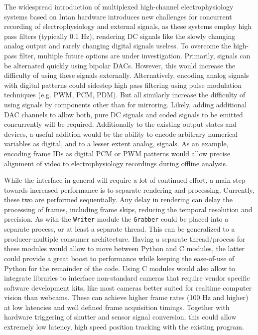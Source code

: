 The widespread introduction of multiplexed high-channel electrophysiology systems based on Intan hardware introduces new challenges for concurrent recording of electrophysiology and external signals, as these systems employ high pass filters (typically 0.1 Hz), rendering DC signals like the slowly changing analog output and rarely changing digital signals useless. To overcome the high-pass filter, multiple future options are under investigation. Primarily, signals can be alternated quickly using bipolar DACs. However, this would increase the difficulty of using these signals externally. Alternatively, encoding analog signals with digital patterns could sidestep high pass filtering using pulse modulation techniques (e.g. PWM, PCM, PDM). But all similarly increase the difficulty of using signals by components other than for mirroring. Likely, adding additional DAC channels to allow both, pure DC signals and coded signals to be emitted concurrently will be required. Additionally to the existing output states and devices, a useful addition would be the ability to encode arbitrary numerical variables as digital, and to a lesser extent analog, signals. As an example, encoding frame IDs as digital PCM or PWM patterns would allow precise alignment of video to electrophysiology recordings during offline analysis.

While the interface in general will require a lot of continued effort, a main step towards increased performance is to separate rendering and processing. Currently, these two are performed sequentially. Any delay in rendering can delay the processing of frames, including frame skips, reducing the temporal resolution and precision. As with the \texttt{Writer} module the \texttt{Grabber} could be placed into a separate process, or at least a separate thread. This can be generalized to a producer-multiple consumer architecture. Having a separate thread/process for these modules would allow to move between Python and C modules, the latter could provide a great boost to performance while keeping the ease-of-use of Python for the remainder of the code. Using C modules would also allow to integrate libraries to interface non-standard cameras that require vendor specific software development kits, like most cameras better suited for realtime computer vision than webcams. These can achieve higher frame rates (100 Hz and higher) at low latencies and well defined frame acquisition timings. Together with hardware triggering of shutter and sensor signal conversion, this could allow extremely low latency, high speed position tracking with the existing program.

